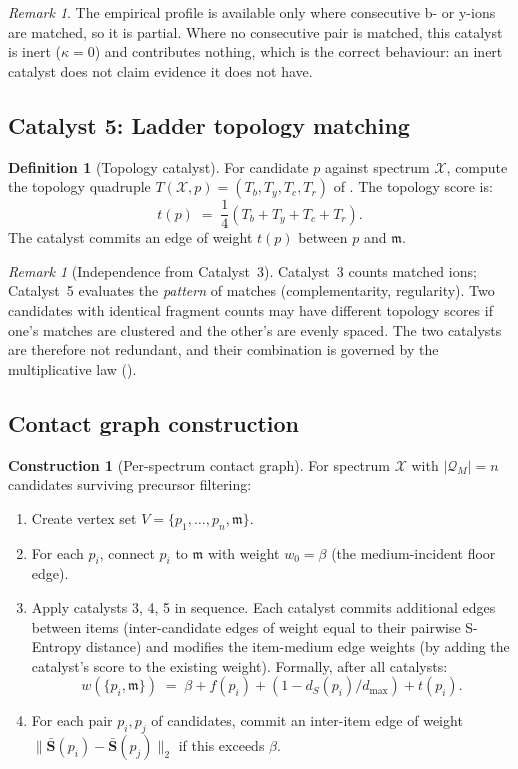 \documentclass[11pt,a4paper]{article}
\theoremstyle{definition}
\newtheorem{definition}[theorem]{Definition}
\newtheorem{construction}[theorem]{Construction}
\theoremstyle{remark}
\newtheorem{remark}[theorem]{Remark}
\newcommand{\wt}{w}
\newcommand{\med}{\mathfrak{m}}
\newcommand{\flo}{\beta}
\newcommand{\Scoord}{\mathbf{S}}
\newcommand{\Pep}{\mathcal{Q}}
\newcommand{\Spec}{\mathcal{X}}
\newcommand{\pot}{\kappa}
\begin{document}
\begin{remark}
The empirical profile is available only where consecutive b- or y-ions
are matched, so it is partial. Where no consecutive pair is matched,
this catalyst is inert ($\pot=0$) and contributes nothing, which is
the correct behaviour: an inert catalyst does not claim evidence it
does not have.
\end{remark}

\subsection{Catalyst 5: Ladder topology matching}

\begin{definition}[Topology catalyst]
\label{def:topo-catalyst}
For candidate $p$ against spectrum $\Spec$, compute the topology
quadruple $T(\Spec,p)=(T_b,T_y,T_c,T_r)$ of .
The topology score is:
\[
  t(p) \;=\; \frac{1}{4}(T_b+T_y+T_c+T_r).
\]
The catalyst commits an edge of weight $t(p)$ between $p$ and $\med$.
\end{definition}

\begin{remark}[Independence from Catalyst~3]
Catalyst~3 counts matched ions; Catalyst~5 evaluates the \emph{pattern}
of matches (complementarity, regularity). Two candidates with identical
fragment counts may have different topology scores if one's matches
are clustered and the other's are evenly spaced. The two catalysts are
therefore not redundant, and their combination is governed by the
multiplicative law ().
\end{remark}

\subsection{Contact graph construction}

\begin{construction}[Per-spectrum contact graph]
\label{con:graph}
For spectrum $\Spec$ with $|\Pep_M|=n$ candidates surviving precursor
filtering:
\begin{enumerate}[leftmargin=2.0em,itemsep=1pt]
  \item Create vertex set $V=\{p_1,\dots,p_n,\med\}$.
  \item For each $p_i$, connect $p_i$ to $\med$ with weight
  $w_0=\flo$ (the medium-incident floor edge).
  \item Apply catalysts 3, 4, 5 in sequence. Each catalyst commits
  additional edges between items (inter-candidate edges of weight
  equal to their pairwise S-Entropy distance) and modifies the
  item-medium edge weights (by adding the catalyst's score to the
  existing weight). Formally, after all catalysts:
  \[
    \wt(\{p_i,\med\}) \;=\; \flo + f(p_i) + (1-d_S(p_i)/d_{\max})
    + t(p_i).
  \]
  \item For each pair $p_i,p_j$ of candidates, commit an inter-item
  edge of weight $\|\bar{\Scoord}(p_i)-\bar{\Scoord}(p_j)\|_2$ if
  this exceeds $\flo$.
\end{enumerate}
\end{construction}
\end{document}
